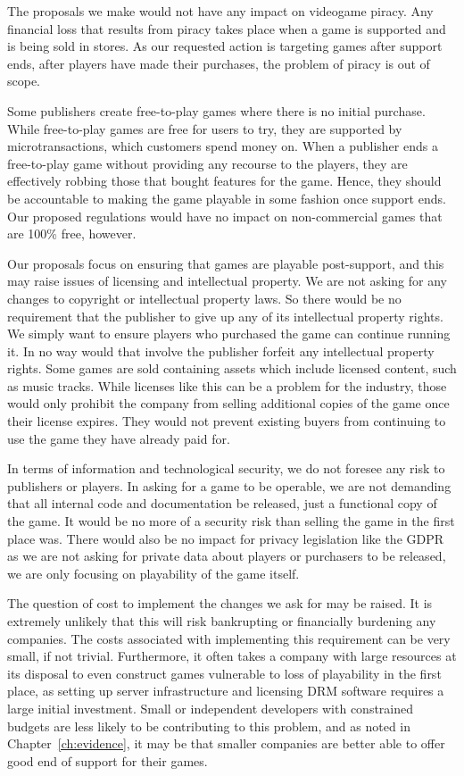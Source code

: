 The proposals we make would not have any impact on videogame piracy.
Any financial loss that results from piracy takes place when a game is supported and is being sold in stores.
As our requested action is targeting games after support ends, after players have made their purchases, the problem of piracy is out of scope.

Some publishers create free-to-play games where there is no initial purchase.
While free-to-play games are free for users to try, they are supported by \glspl{microtransaction}, which customers spend money on.
When a publisher ends a free-to-play game without providing any recourse to the players, they are effectively robbing those that bought features for the game.
Hence, they should be accountable to making the game playable in some fashion once support ends.
Our proposed regulations would have no impact on non-commercial games that are 100\% free, however.

Our proposals focus on ensuring that games are playable post-support, and this may raise issues of licensing and intellectual property.
We are not asking for any changes to copyright or intellectual property laws.
So there would be no requirement that the publisher to give up any of its intellectual property rights.
We simply want to ensure players who purchased the game can continue running it.
In no way would that involve the publisher forfeit any intellectual property rights.
Some games are sold containing \glspl{asset} which include licensed content, such as music tracks.
While licenses like this can be a problem for the industry, those would only prohibit the company from selling additional copies of the game once their license expires.
They would not prevent existing buyers from continuing to use the game they have already paid for.

In terms of information and technological security, we do not foresee any risk to publishers or players.
In asking for a game to be operable, we are not demanding that all internal code and documentation be released, just a functional copy of the game.
It would be no more of a security risk than selling the game in the first place was.
There would also be no impact for privacy legislation like the GDPR as we are not asking for private data about players or purchasers to be released,
we are only focusing on playability of the game itself.

The question of cost to implement the changes we ask for may be raised.
It is extremely unlikely that this will risk bankrupting or financially burdening any companies.
The costs associated with implementing this requirement can be very small, if not trivial\cn.
Furthermore, it often takes a company with large resources at its disposal to even construct games vulnerable to loss of playability in the first place,
as setting up server infrastructure and licensing DRM software requires a large initial investment.
Small or independent developers with constrained budgets are less likely to be contributing to this problem,
and as noted in Chapter~\ref{ch:evidence}, it may be that smaller companies are better able to offer good end of support for their games.
